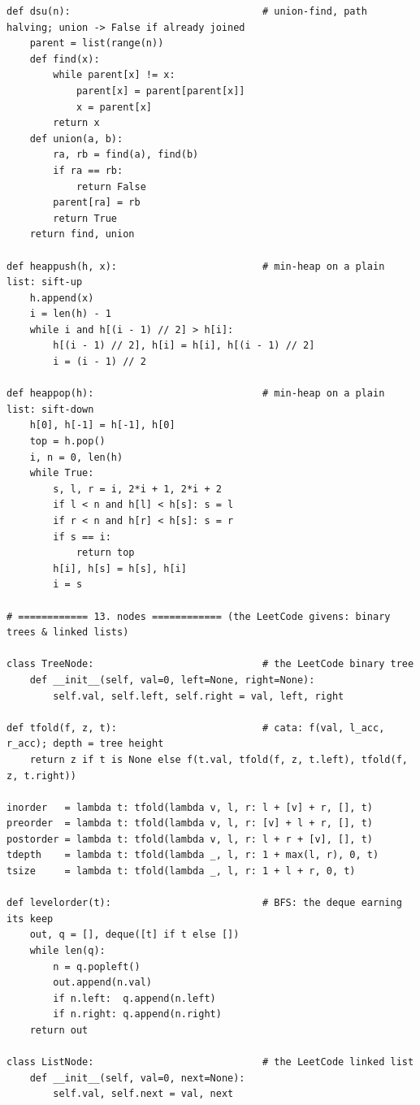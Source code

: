 \documentclass[10pt,letterpaper]{book}
\begin{document}
\begin{lstlisting}[style=file]
def dsu(n):                                 # union-find, path halving; union -> False if already joined
    parent = list(range(n))
    def find(x):
        while parent[x] != x:
            parent[x] = parent[parent[x]]
            x = parent[x]
        return x
    def union(a, b):
        ra, rb = find(a), find(b)
        if ra == rb:
            return False
        parent[ra] = rb
        return True
    return find, union

def heappush(h, x):                         # min-heap on a plain list: sift-up
    h.append(x)
    i = len(h) - 1
    while i and h[(i - 1) // 2] > h[i]:
        h[(i - 1) // 2], h[i] = h[i], h[(i - 1) // 2]
        i = (i - 1) // 2

def heappop(h):                             # min-heap on a plain list: sift-down
    h[0], h[-1] = h[-1], h[0]
    top = h.pop()
    i, n = 0, len(h)
    while True:
        s, l, r = i, 2*i + 1, 2*i + 2
        if l < n and h[l] < h[s]: s = l
        if r < n and h[r] < h[s]: s = r
        if s == i:
            return top
        h[i], h[s] = h[s], h[i]
        i = s

# ============ 13. nodes ============ (the LeetCode givens: binary trees & linked lists)

class TreeNode:                             # the LeetCode binary tree
    def __init__(self, val=0, left=None, right=None):
        self.val, self.left, self.right = val, left, right

def tfold(f, z, t):                         # cata: f(val, l_acc, r_acc); depth = tree height
    return z if t is None else f(t.val, tfold(f, z, t.left), tfold(f, z, t.right))

inorder   = lambda t: tfold(lambda v, l, r: l + [v] + r, [], t)
preorder  = lambda t: tfold(lambda v, l, r: [v] + l + r, [], t)
postorder = lambda t: tfold(lambda v, l, r: l + r + [v], [], t)
tdepth    = lambda t: tfold(lambda _, l, r: 1 + max(l, r), 0, t)
tsize     = lambda t: tfold(lambda _, l, r: 1 + l + r, 0, t)

def levelorder(t):                          # BFS: the deque earning its keep
    out, q = [], deque([t] if t else [])
    while len(q):
        n = q.popleft()
        out.append(n.val)
        if n.left:  q.append(n.left)
        if n.right: q.append(n.right)
    return out

class ListNode:                             # the LeetCode linked list
    def __init__(self, val=0, next=None):
        self.val, self.next = val, next


\end{lstlisting}
\end{document}
